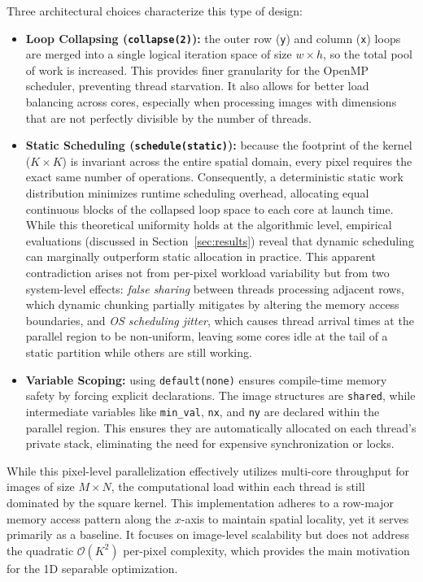 \documentclass[10pt,twocolumn,letterpaper]{article}
\begin{document}
Three architectural choices characterize this type of design:

\begin{itemize}
    \item \textbf{Loop Collapsing (\lstinline|collapse(2)|):} the outer row (\lstinline|y|) and column (\lstinline|x|) loops are merged into a single logical iteration space of size $w \times h$, so the total pool of work is increased. This provides finer granularity for the OpenMP scheduler, preventing thread starvation. It also allows for better load balancing across cores, especially when processing images with dimensions that are not perfectly divisible by the number of threads.
\item \textbf{Static Scheduling (\lstinline|schedule(static)|):} because the 
footprint of the kernel ($K \times K$) is invariant across the entire spatial domain, 
every pixel requires the exact same number of operations. Consequently, a deterministic 
static work distribution minimizes runtime scheduling overhead, allocating equal 
continuous blocks of the collapsed loop space to each core at launch time. While this 
theoretical uniformity holds at the algorithmic level, empirical evaluations 
(discussed in Section~\ref{sec:results}) reveal that dynamic scheduling can 
marginally outperform static allocation in practice. This apparent contradiction 
arises not from per-pixel workload variability but from 
two system-level effects: \textit{false sharing} between threads processing 
adjacent rows, which dynamic chunking partially mitigates by altering the memory 
access boundaries, and \textit{OS scheduling jitter}, which causes thread 
arrival times at the parallel region to be non-uniform, leaving some cores 
idle at the tail of a static partition while others are still working.    \item \textbf{Variable Scoping:} using \lstinline|default(none)| ensures compile-time memory safety by forcing explicit declarations. The image structures are \lstinline|shared|, while intermediate variables like \lstinline|min_val|, \lstinline|nx|, and \lstinline|ny| are declared within the parallel region. This ensures they are automatically allocated on each thread's private stack, eliminating the need for expensive synchronization or locks.
\end{itemize}

While this pixel-level parallelization effectively utilizes multi-core throughput for images 
of size $M \times N$, the computational load within each thread is still dominated by the 
square kernel. This implementation adheres to a row-major memory access pattern 
along the $x$-axis to maintain spatial locality, yet it serves primarily as a baseline. It 
focuses on image-level scalability but does not address the quadratic $\mathcal{O}(K^2)$ 
per-pixel complexity, which provides the main motivation for the 1D separable optimization.
\end{document}
